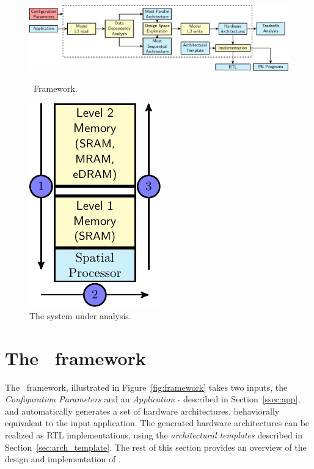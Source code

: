\begin{figure}[!ht]
\begin{minipage}{.7\textwidth}
\includegraphics[width=\textwidth,left]{images/framework_v2.pdf}
  \caption{\small \frameworkname~Framework.}{}
  \label{fig:framework}
\end{minipage}%
\begin{minipage}{.3\textwidth}
    \centering
\includegraphics[width=.4\textwidth]{images/architecture_v2.pdf}
\caption{\small The system under analysis.
    }
\label{fig:system}
\end{minipage}
\squeezeup
\squeezeup
\end{figure}
\section{The \frameworkname~framework}
\label{sec:framework}
The \frameworkname~framework, illustrated in Figure~\ref{fig:framework} takes two inputs, the \textit{Configuration Parameters} and an \textit{Application} - described in Section~\ref{ssec:app}, and automatically generates a set of hardware architectures, behaviorally equivalent to the input application.
The generated hardware architectures can be realized as RTL implementations, using the \textit{architectural templates} described in Section~\ref{sec:arch_template}.
The rest of this section provides an overview of the design and implementation of \frameworkname.

